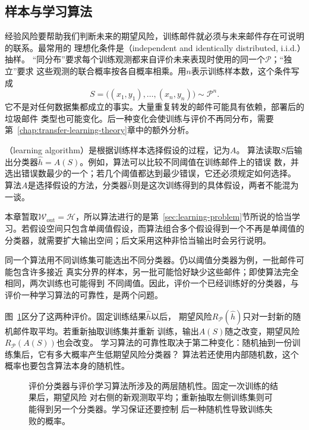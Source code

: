 \subsection{样本与学习算法}

经验风险要帮助我们判断未来的期望风险，训练邮件就必须与未来邮件存在可说明的联系。最常用的
理想化条件是（independent and identically distributed, i.i.d.）抽样。
“同分布”要求每个训练观测都来自评价未来表现时使用的同一个$\mathcal P$；“独立”要求
这些观测的联合概率按各自概率相乘。用$n$表示训练样本数，这个条件写成
\begin{equation}
 S=\bigl((x_1,y_1),\ldots,(x_n,y_n)\bigr)\sim\mathcal P^n.
 \label{eq:training-sample-distribution}
\end{equation}
它不是对任何数据集都成立的事实。大量重复转发的邮件可能具有依赖，部署后的垃圾邮件
类型也可能变化。后一种变化会使训练与评价不再同分布，需要
第~\ref{chap:transfer-learning-theory}章中的额外分析。

（learning algorithm）是根据训练样本选择假设的过程，记为$A$。
算法读取$S$后输出分类器$\hat h=A(S)$。例如，算法可以比较不同阈值在训练邮件上的错误
数，并选出错误数最少的一个；若几个阈值都达到最少错误，它还必须规定如何选择。
算法$A$是选择假设的方法，分类器$\hat h$则是这次训练得到的具体假设，两者不能混为一谈。

本章暂取$\mathcal W_{\mathrm{out}}=\mathcal H$，所以算法进行的是第~\ref{sec:learning-problem}节所说的恰当学习。若假设空间只包含单阈值假设，而算法组合多个假设得到一个不再是单阈值的分类器，就需要扩大输出空间；后文采用这种非恰当输出时会另行说明。

同一个算法用不同训练集可能选出不同分类器。仍以阈值分类器为例，一批邮件可能包含许多接近
真实分界的样本，另一批可能恰好缺少这些邮件；即使算法完全相同，两次训练也可能得到
不同阈值。因此，评价一个已经训练好的分类器，与评价一种学习算法的可靠性，是两个问题。

图~\ref{fig:learning-two-randomness}区分了这两种评价。固定训练结果$\hat h$以后，
期望风险$R_{\mathcal P}(\hat h)$只对一封新的随机邮件取平均。若重新抽取训练集并重新
训练，输出$A(S)$随之改变，期望风险$R_{\mathcal P}(A(S))$也会改变。
学习算法的可靠性取决于第二种变化：随机抽到一份训练集后，它有多大概率产生低期望风险分类器？
算法若还使用内部随机数，这个概率也要包含算法本身的随机性。

\begin{figure}[htbp]
 \centering
 
 \caption{评价分类器与评价学习算法所涉及的两层随机性。固定一次训练的结果后，期望风险
 对右侧的新观测取平均；重新抽取左侧训练集则可能得到另一个分类器。学习保证还要控制
 后一种随机性导致训练失败的概率。}
 \label{fig:learning-two-randomness}
\end{figure}


